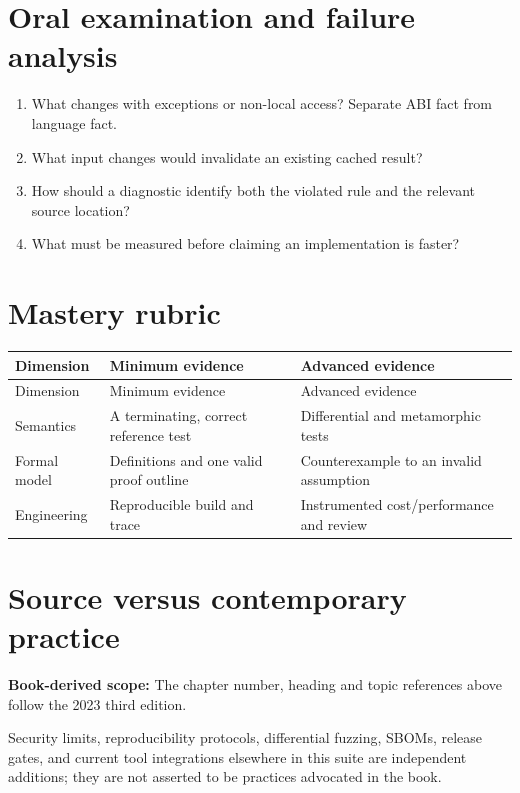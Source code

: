 \documentclass[10pt,letterpaper]{article}
\begin{document}
\section{Oral examination and failure analysis}
\begin{enumerate}
\item What changes with exceptions or non-local access? Separate ABI fact from language fact.
\item What input changes would invalidate an existing cached result?
\item How should a diagnostic identify both the violated rule and the relevant source location?
\item What must be measured before claiming an implementation is faster?
\end{enumerate}

\section{Mastery rubric}
\begin{longtable}{|>{\raggedright\arraybackslash}p{}|>{\raggedright\arraybackslash}p{}|>{\raggedright\arraybackslash}p{}|}
\hline
Dimension & Minimum evidence & Advanced evidence\\ \hline\endfirsthead
\hline
Dimension & Minimum evidence & Advanced evidence\\ \hline\endhead
Semantics & A terminating, correct reference test & Differential and metamorphic tests\\ \hline
Formal model & Definitions and one valid proof outline & Counterexample to an invalid assumption\\ \hline
Engineering & Reproducible build and trace & Instrumented cost/performance and review\\ \hline
\end{longtable}

\section{Source versus contemporary practice}
\textbf{Book-derived scope:} The chapter number, heading and topic references above follow the 2023 third edition.\par\modern Security limits, reproducibility protocols, differential fuzzing, SBOMs, release gates, and current tool integrations elsewhere in this suite are independent additions; they are not asserted to be practices advocated in the book.
\end{document}
